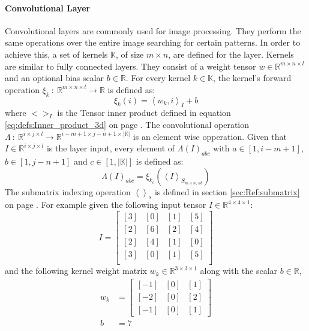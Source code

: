 \documentclass[12pt]{article}
\newcommand{\equationref}[1]{equation \ref{#1} on page \pageref{#1}}
\newcommand{\sectionref}[1]{section \ref{#1} on page \pageref{#1}}
\begin{document}
\paragraph{Convolutional Layer}
Convolutional layers are commonly used for image processing. They perform the same operations over the entire image searching for certain patterns. In order to achieve this, a set of kernels \(\mathbb{K}\), of size \(m\times n\), are defined for the layer. Kernels are similar to fully connected layers. They consist of a weight tensor \(w\in\mathbb{R}^{m \times n \times l}\) and an optional bias scalar \(b\in\mathbb{R}\). For every kernel \(k\in \mathbb{K}\), the kernel's forward operation \(\xi_k~:~\mathbb{R}^{m \times n \times l}\to\mathbb{R}\) is defined as:
\begin{equation}\label{eq:NN:kernelOpperation}
\xi_k(i) = \left<w_k, i\right>_I + b
\end{equation}
where \(<>_I\) is the Tensor inner product defined in \equationref{eq:defs:Inner_product_3d}.
The convolutional operation \(\Lambda~:~\mathbb{R}^{i\times j \times l}\to\mathbb{R}^{i-m+1 \times j-n+1 \times |\mathbb{K}|}\) is an element wise opperation. Given that  \(I \in \mathbb{R}^{i\times j\times l}\) is the layer input, every element of \(\Lambda(I)_{abc}\) with \(a \in [1, i-m+1]\), \(b \in [1, j-n+1]\) and \(c \in [1, |\mathbb{K}|]\) is defined as:
\begin{equation}\label{eq:NN:convolutional_opperation}
\Lambda(I)_{abc} = \xi_{k_c}(\left<I\right>_{S_{m\times n,\,ab}})
\end{equation}
The submatrix indexing operation \(\left<\right>_s\) is defined in \sectionref{sec:Ref:submatrix}.
For example given the following input tensor \(I \in\mathbb{R}^{4\times4\times1}\): %
\[
I = \left[
\begin{matrix}
[3] & [0] & [1] & [5] \\
[2] & [6] & [2] & [4] \\
[2] & [4] & [1] & [0] \\
[3] & [0] & [1] & [5] \\
\end{matrix}
\right]
\]
and the following kernel weight matrix \(w_k \in \mathbb{R}^{3 \times 3 \times 1}\) along with the scalar \(b\in \mathbb{R}\),
\begin{align*}
w_k &= \left[
\begin{matrix}
[-1] & [0] & [1] \\ 
[-2] & [0] & [2] \\
[-1] & [0] & [1]
\end{matrix}
\right]\\
b &=7\\
\end{align*}
\end{document}
